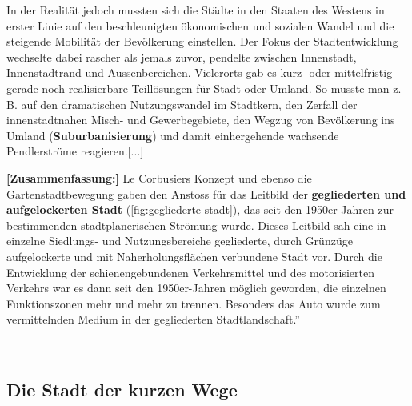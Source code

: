 \begin{textBox}[title=Die gegliederte Stadt]
	In der Realität jedoch mussten sich die Städte in den Staaten des Westens in erster Linie auf den beschleunigten ökonomischen und sozialen Wandel und die steigende Mobilität der Bevölkerung einstellen. Der Fokus der Stadtentwicklung wechselte dabei rascher als jemals zuvor, pendelte zwischen Innenstadt, Innenstadtrand und Aussenbereichen. Vielerorts gab es kurz- oder mittelfristig gerade noch realisierbare Teillösungen für Stadt oder Umland. So musste man z. B. auf den dramatischen Nutzungswandel im Stadtkern, den Zerfall der innenstadtnahen Misch- und Gewerbegebiete, den Wegzug von Bevölkerung ins Umland (\textbf{Suburbanisierung}) und damit einhergehende wachsende Pendlerströme reagieren.[...]

	\textbf{[Zusammenfassung:]} Le Corbusiers Konzept und ebenso die Gartenstadtbewegung gaben den Anstoss für das Leitbild der \textbf{gegliederten und aufgelockerten Stadt} (\cref{fig:gegliederte-stadt}), das seit den 1950er-Jahren zur bestimmenden stadtplanerischen Strömung wurde. Dieses Leitbild sah eine in einzelne Siedlungs- und Nutzungsbereiche gegliederte, durch Grünzüge aufgelockerte und mit Naherholungsflächen verbundene Stadt vor. Durch die Entwicklung der schienengebundenen Verkehrsmittel und des motorisierten Verkehrs war es dann seit den 1950er-Jahren möglich geworden, die einzelnen Funktionszonen mehr und mehr zu trennen. Besonders das Auto wurde zum vermittelnden Medium in der gegliederten Stadtlandschaft.''

	--\textcite{westermann}

\end{textBox}

\subsection{Die Stadt der kurzen Wege}


